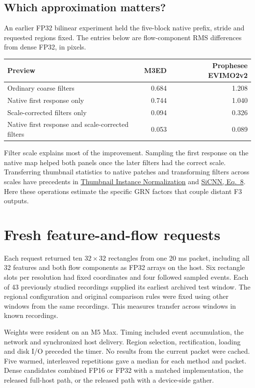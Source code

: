 \documentclass[11pt,letterpaper]{article}
\begin{document}
\subsection{Which approximation matters?}
An earlier FP32 bilinear experiment held the five-block native prefix, stride and requested regions fixed. The entries below are flow-component RMS differences from dense FP32, in pixels.

\begin{center}\small
\begin{tabular}{@{}lrr@{}}\toprule
Preview & M3ED & Prophesee EVIMO2v2\\\midrule
Ordinary coarse filters & 0.684 & 1.208\\
Native first response only & 0.744 & 1.040\\
Scale-corrected filters only & 0.094 & 0.326\\
Native first response and scale-corrected filters & 0.053 & 0.089\\\bottomrule
\end{tabular}\end{center}
Filter scale explains most of the improvement. Sampling the first response on the native map helped both panels once the later filters had the correct scale. Transferring thumbnail statistics to native patches and transforming filters across scales have precedents in \href{https://arxiv.org/abs/2103.11784}{Thumbnail Instance Normalization} and \href{https://arxiv.org/pdf/1411.6369}{SiCNN, Eq.~8}. Here these operations estimate the specific GRN factors that couple distant F3 outputs.

\newpage
\section{Fresh feature-and-flow requests}
Each request returned ten $32\times32$ rectangles from one 20 ms packet, including all 32 features and both flow components as FP32 arrays on the host. Six rectangle slots per resolution had fixed coordinates and four followed sampled events. Each of 43 previously studied recordings supplied its earliest archived test window. The regional configuration and original comparison rules were fixed using other windows from the same recordings. This measures transfer across windows in known recordings.

Weights were resident on an M5 Max. Timing included event accumulation, the network and synchronized host delivery. Region selection, rectification, loading and disk I/O preceded the timer. No results from the current packet were cached. Five warmed, interleaved repetitions gave a median for each method and packet. Dense candidates combined FP16 or FP32 with a matched implementation, the released full-host path, or the released path with a device-side gather.
\end{document}
